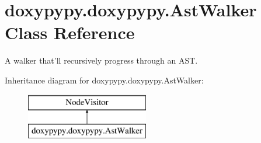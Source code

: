\hypertarget{classdoxypypy_1_1doxypypy_1_1_ast_walker}{\section{doxypypy.\-doxypypy.\-Ast\-Walker Class Reference}
\label{classdoxypypy_1_1doxypypy_1_1_ast_walker}
}


A walker that'll recursively progress through an A\-S\-T.  


Inheritance diagram for doxypypy.\-doxypypy.\-Ast\-Walker\-:\begin{figure}[H]
\begin{center}
\leavevmode
\includegraphics[height=2.000000cm]{classdoxypypy_1_1doxypypy_1_1_ast_walker}
\end{center}
\end{figure}
